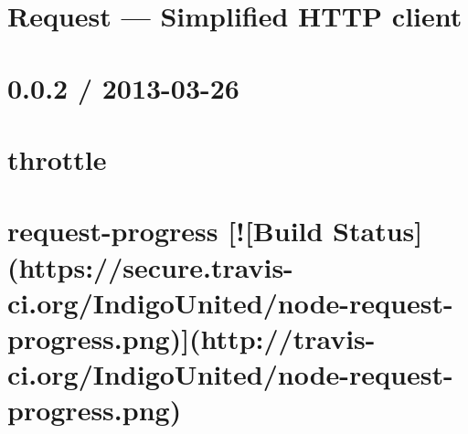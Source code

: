 \documentclass[twoside]{book}
\newcommand{\+}{\discretionary{\mbox{\scriptsize$\hookleftarrow$}}{}{}}
\begin{document}
\chapter{Request — Simplified H\+T\+T\+P client}
\label{md__c_1__users_martin__documents__git_hub_visual_studio__bachelor__wis_r__wis_r_node_modules_gru51d5677477b4ab77048c95939bf1cc91}
\hypertarget{md__c_1__users_martin__documents__git_hub_visual_studio__bachelor__wis_r__wis_r_node_modules_gru51d5677477b4ab77048c95939bf1cc91}{}

\chapter{0.0.2 / 2013-\/03-\/26}
\label{md__c_1__users_martin__documents__git_hub_visual_studio__bachelor__wis_r__wis_r_node_modules_gru21feb639fe19058b0fe32f8bcf3d7a7f}
\hypertarget{md__c_1__users_martin__documents__git_hub_visual_studio__bachelor__wis_r__wis_r_node_modules_gru21feb639fe19058b0fe32f8bcf3d7a7f}{}

\chapter{throttle}
\label{md__c_1__users_martin__documents__git_hub_visual_studio__bachelor__wis_r__wis_r_node_modules_grub94753a0a2e7fad9455839b4450ddfe1}
\hypertarget{md__c_1__users_martin__documents__git_hub_visual_studio__bachelor__wis_r__wis_r_node_modules_grub94753a0a2e7fad9455839b4450ddfe1}{}

\chapter{request-\/progress \mbox{[}!\mbox{[}Build Status\mbox{]}(https\+://secure.travis-\/ci.org/\+Indigo\+United/node-\/request-\/progress.png)\mbox{]}(http\+://travis-\/ci.org/\+Indigo\+United/node-\/request-\/progress.png)}
\label{md__c_1__users_martin__documents__git_hub_visual_studio__bachelor__wis_r__wis_r_node_modules_gru4717bca28afeebe04d2382290db4f53d}
\hypertarget{md__c_1__users_martin__documents__git_hub_visual_studio__bachelor__wis_r__wis_r_node_modules_gru4717bca28afeebe04d2382290db4f53d}{}

\end{document}

